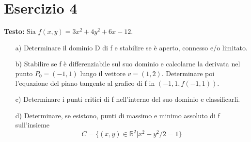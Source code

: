 \documentclass[12pt, a4paper]{article}
\begin{document}
\newpage

\section*{Esercizio 4}

\textbf{Testo:} Sia $f(x,y) = 3x^{2} + 4y^{2} + 6x - 12$.
\begin{enumerate}
    \item[a)] Determinare il dominio D di f e stabilire se è aperto, connesso e/o limitato.
    \item[b)] Stabilire se f è differenziabile sul suo dominio e calcolarne la derivata nel punto $P_{0}=(-1,1)$ lungo il vettore $v=(1,2)$. Determinare poi l'equazione del piano tangente al grafico di f in $(-1,1,f(-1,1))$.
    \item[c)] Determinare i punti critici di f nell'interno del suo dominio e classificarli.
    \item[d)] Determinare, se esistono, punti di massimo e minimo assoluto di f sull'insieme
    \[ C = \{(x,y) \in \mathbb{R}^{2} | x^{2}+y^{2}/2=1\} \]
\end{enumerate}
\end{document}
